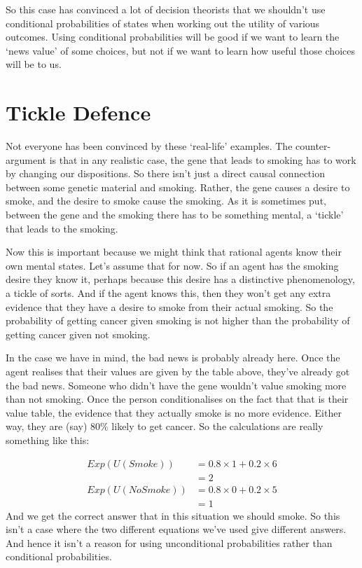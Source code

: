 So this case has convinced a lot of decision theorists that we shouldn't use conditional probabilities of states when working out the utility of various outcomes. Using conditional probabilities will be good if we want to learn the `news value' of some choices, but not if we want to learn how useful those choices will be to us.

\section{Tickle Defence}
Not everyone has been convinced by these `real-life' examples. The counter-argument is that in any realistic case, the gene that leads to smoking has to work by changing our dispositions. So there isn't just a direct causal connection between some genetic material and smoking. Rather, the gene causes a desire to smoke, and the desire to smoke cause the smoking. As it is sometimes put, between the gene and the smoking there has to be something mental, a `tickle' that leads to the smoking.

Now this is important because we might think that rational agents know their own mental states. Let's assume that for now. So if an agent has the smoking desire they know it, perhaps because this desire has a distinctive phenomenology, a tickle of sorts. And if the agent knows this, then they won't get any extra evidence that they have a desire to smoke from their actual smoking. So the probability of getting cancer given smoking is not higher than the probability of getting cancer given not smoking.

In the case we have in mind, the bad news is probably already here. Once the agent realises that their values are given by the table above, they've already got the bad news. Someone who didn't have the gene wouldn't value smoking more than not smoking. Once the person conditionalises on the fact that that is their value table, the evidence that they actually smoke is no more evidence. Either way, they are (say) 80\% likely to get cancer. So the calculations are really something like this:

 \begin{align*}
Exp(U(Smoke)) &= 0.8 \times 1 + 0.2 \times 6 \\
  &= 2 \\
 Exp(U(No Smoke)) &= 0.8 \times 0 + 0.2 \times 5 \\
  &= 1
\end{align*}
And we get the correct answer that in this situation we should smoke. So this isn't a case where the two different equations we've used give different answers. And hence it isn't a reason for using unconditional probabilities rather than conditional probabilities.

